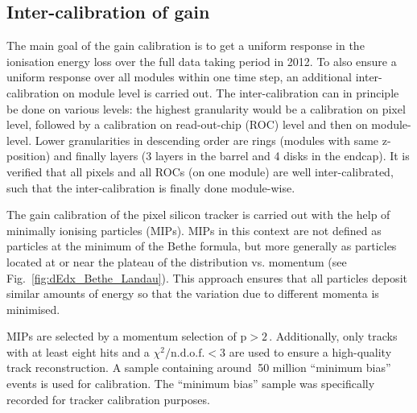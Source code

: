 \subsection*{Inter-calibration of gain}
The main goal of the gain calibration is to get a uniform response in the ionisation energy loss \dedx over the full data taking period in 2012.
To also ensure a uniform response over all modules within one time step, an additional inter-calibration on module level is carried out.
The inter-calibration can in principle be done on various levels: the highest granularity would be a calibration on pixel level, followed by a calibration on read-out-chip (ROC) level and then on module-level.
Lower granularities in descending order are rings (modules with same z-position) and finally layers (3 layers in the barrel and 4 disks in the endcap). 
It is verified that all pixels and all ROCs (on one module) are well inter-calibrated, such that the inter-calibration is finally done module-wise.


The gain calibration of the pixel silicon tracker is carried out with the help of minimally ionising particles (MIPs).
MIPs in this context are not defined as particles at the minimum of the Bethe formula, but more generally as particles located at or near the plateau of the \dedx distribution vs. momentum (see Fig.~\ref{fig:dEdx_Bethe_Landau}).
This approach ensures that all particles deposit similar amounts of energy so that the variation due to different momenta is minimised.

MIPs are selected by a momentum selection of $\text{p}>2\,$\gev.
Additionally, only tracks with at least eight hits and a $\chi^2/\text{n.d.o.f.}<3$ are used to ensure a high-quality track reconstruction.
A sample containing around $~$50 million ``minimum bias'' events is used for calibration.
The ``minimum bias'' sample was specifically recorded for tracker calibration purposes.

